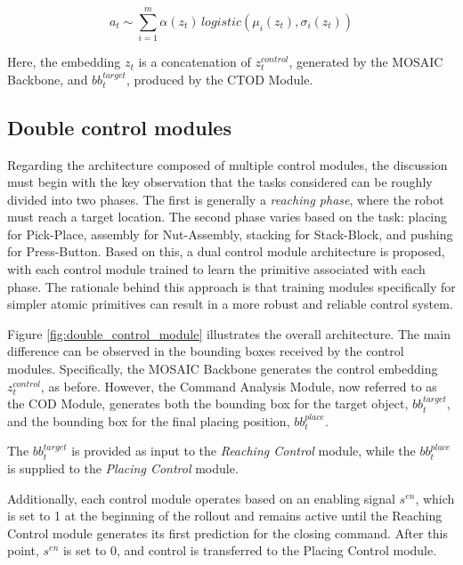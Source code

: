 \begin{equation}
    \label{equation:logistic_distribution}
    a_{t} \sim \sum_{i=1}^{m} \alpha(z_t) \, logistic(\mu_{i}(z_t), \sigma_{i}(z_t))
\end{equation}

Here, the embedding $z_t$ is a concatenation of $z^{control}_{t}$, generated by the MOSAIC Backbone, and $bb^{target}_t$, produced by the CTOD Module.



\subsection{Double control modules}
\label{sec:ocpl_architecture_dcm}
Regarding the architecture composed of multiple control modules, the discussion must begin with the key observation that the tasks considered can be roughly divided into two phases. The first is generally a \textit{reaching phase}, where the robot must reach a target location. The second phase varies based on the task: placing for Pick-Place, assembly for Nut-Assembly, stacking for Stack-Block, and pushing for Press-Button. Based on this, a dual control module architecture is proposed, with each control module trained to learn the primitive associated with each phase. The rationale behind this approach is that training modules specifically for simpler atomic primitives can result in a more robust and reliable control system.

Figure \ref{fig:double_control_module} illustrates the overall architecture. The main difference can be observed in the bounding boxes received by the control modules. Specifically, the MOSAIC Backbone generates the control embedding $z^{control}_t$, as before. However, the Command Analysis Module, now referred to as the COD Module, generates both the bounding box for the target object, $bb^{target}_t$, and the bounding box for the final placing position, $bb^{place}_t$. 

The $bb^{target}_t$ is provided as input to the \textit{Reaching Control} module, while the $bb^{place}_t$ is supplied to the \textit{Placing Control} module. 

Additionally, each control module operates based on an enabling signal $s^{en}$, which is set to 1 at the beginning of the rollout and remains active until the Reaching Control module generates its first prediction for the closing command. After this point, $s^{en}$ is set to 0, and control is transferred to the Placing Control module.    

